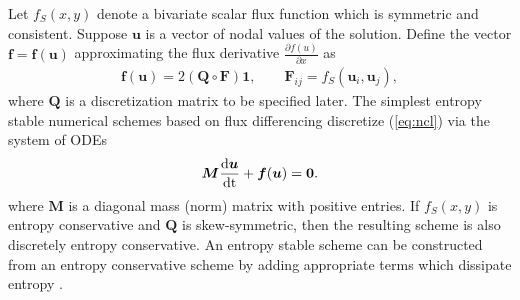 \documentclass{article}
\newcommand{\td}[2]{\frac{{\rm d}#1}{{\rm d}{\rm #2}}}
\newcommand{\pd}[2]{\frac{\partial#1}{\partial#2}}
\newcommand{\LRp}[1]{\left( #1 \right)}
\newcommand{\eqlab}[1]{\begin{align}#1\end{align}}
\begin{document}
Let $f_S(x,y)$ denote a bivariate scalar flux function which is symmetric and consistent.  Suppose $\bm{u}$ is a vector of nodal values of the solution.  Define the vector $\bm{f} = \bm{f}(\bm{u})$ approximating the flux derivative $\pd{f(u)}{x}$ as 
\eqlab{
\bm{f}(\bm{u}) = 2\LRp{\bm{Q}\circ \bm{F}}\bm{1}, \qquad \bm{F}_{ij} = f_S(\bm{u}_i,\bm{u}_j),
\label{eq:fu}
}
where $\bm{Q}$ is a discretization matrix to be specified later.  The simplest entropy stable numerical schemes based on flux differencing discretize (\ref{eq:ncl}) via the system of ODEs
\[
\bm{M}\td{\bm{u}}{t} + \bm{f}(\bm{u}) = \bm{0}.
\]
where $\bm{M}$ is a diagonal mass (norm) matrix with positive entries.  If $f_S(x,y)$ is entropy conservative and $\bm{Q}$ is skew-symmetric, then the resulting scheme is also discretely entropy conservative.  An entropy stable scheme can be constructed from an entropy conservative scheme by adding appropriate terms which dissipate entropy \cite{chen2017entropy, upperman2019entropy, hicken2020entropy}. 
\end{document}
